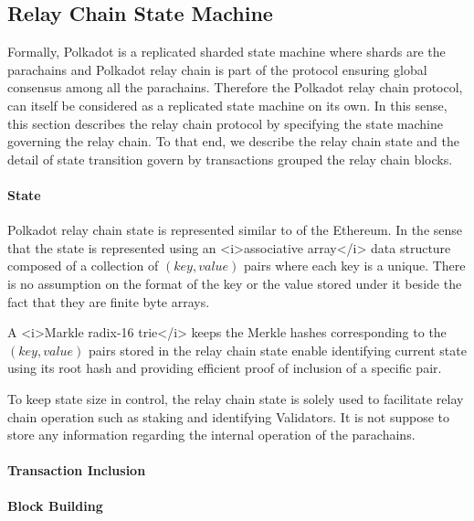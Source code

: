 \subsection{Relay Chain State Machine}\label{sec:relaychain}

Formally, Polkadot is a replicated sharded state machine where shards are the parachains and Polkadot relay chain is part of the protocol ensuring global consensus among all the parachains. Therefore the Polkadot relay chain protocol, can itself be considered as a replicated state machine on its own. In this sense, this section describes the relay chain protocol by specifying the state machine governing the relay chain. To that end, we describe the relay chain state and the detail of state transition govern by transactions grouped the relay chain blocks.

\paragraph{State}
Polkadot relay chain state is represented similar to of the Ethereum. In the sense that the state is represented using an <i>associative array</i> data structure composed of a collection of $(key, value)$ pairs where each key is a unique. There is no assumption on the format of the key or the value stored under it beside the fact that they are finite byte arrays.

A <i>Markle radix-16 trie</i> keeps the Merkle hashes corresponding to the $(key, value)$ pairs stored in the relay chain state enable identifying current state using its root hash and providing efficient proof of inclusion of a specific pair.

To keep state size in control, the relay chain state is solely used to facilitate relay chain operation such as staking and identifying Validators. It is not suppose to store any information regarding the internal operation of the parachains.

\paragraph{Transaction Inclusion}

\paragraph{Block Building}\label{sec:relaychainblockproduction}
 
